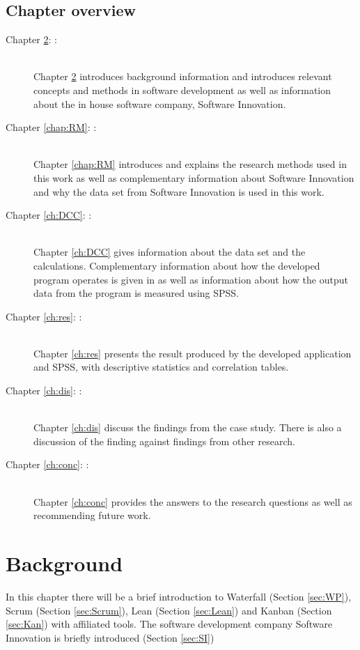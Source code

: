 \documentclass[UKenglish]{ifimaster}  %
\begin{document}
\section{Chapter overview}
\begin{description}
\item[Chapter \ref{chap:Background}: :] \hfill \\  
Chapter \ref{chap:Background} introduces background information and introduces relevant concepts and methods in software development as well as information about the in house software company, Software Innovation. 
\item[Chapter \ref{chap:RM}: :] \hfill \\  
Chapter \ref{chap:RM} introduces and explains the research methods used in this work as well as complementary information about Software Innovation and why the data set from Software Innovation is used in this work.  
\item[Chapter \ref{ch:DCC}: :] \hfill \\
Chapter \ref{ch:DCC} gives information about the data set and the calculations. Complementary information about how the developed program operates is given in as well as information about how the output data from the program is measured using SPSS.

\item[Chapter \ref{ch:res}: :] \hfill \\
Chapter \ref{ch:res} presents the result produced by the developed application and SPSS, with descriptive statistics and correlation tables. 
\item[Chapter \ref{ch:dis}: :] \hfill \\
Chapter \ref{ch:dis} discuss the findings from the case study. There is also a discussion of the finding against findings from other research. 
\item[Chapter \ref{ch:conc}: :] \hfill \\
Chapter \ref{ch:conc} provides the answers to the research questions as well as recommending future work.
\end{description}


\chapter{Background}  
\label{chap:Background}                %
In this chapter there will be a brief introduction to Waterfall (Section \ref{sec:WP}), Scrum (Section \ref{sec:Scrum}), Lean (Section \ref{sec:Lean}) and Kanban (Section \ref{sec:Kan}) with affiliated tools. The software development company Software Innovation is briefly introduced (Section \ref{sec:SI})
\end{document}
